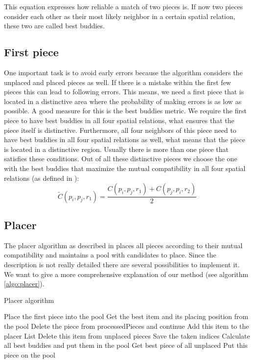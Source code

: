 \documentclass[11pt]{report}
\begin{document}
This equation expresses how reliable a match of two pieces is. If now two pieces consider each other as their most likely neighbor in a certain spatial relation, these two are called best buddies.

\subsection{First piece}
One important task is to avoid early errors because the algorithm considers the unplaced and placed pieces as well. If there is a mistake within the first few pieces this can lead to following errors.
This means, we need a first piece that is located in a distinctive area where the probability of making errors is as low as possible. A good measure for this is the best buddies metric. We require the first piece to have best buddies in all four spatial relations, what ensures that the piece itself is distinctive. Furthermore, all four neighbors of this piece need to have best buddies in all four spatial relations as well, what means that the piece is located in a distinctive region. 
Usually there is more than one piece that satisfies these conditions. Out of all these distinctive pieces we choose the one with the best buddies that maximize the mutual compatibility in all four spatial relations (as defined in \cite{Paikin2015}):
\begin{equation}\label{eq:mutualComp}
\widetilde{C}(p_i,p_j,r_1) = \frac{C(p_i,p_j,r_1)+C(p_j,p_i,r_2)}{2}
\end{equation}

\subsection{Placer}
The placer algorithm as described in \cite{Paikin2015} places all pieces according to their mutual compatibility and maintains a pool with candidates to place. Since the description is not really detailed there are several possibilities to implement it. We want to give a more comprehensive explanation of our method (see algorithm \ref{algo:placer}).

\begin{algorithm}
	\caption{Placer algorithm}
	\label{algo:placer}
	\begin{algorithmic}
		\State Place the first piece into the pool
				\State Get the best item and its placing position from the pool
					\State Delete the piece from processedPieces and continue \EndIf
				\State Add this item to the placer List
				\State Delete this item from unplaced pieces
				\State Save the taken indices
				\State Calculate all best buddies and put them in the pool
			\EndWhile
		\State Get best piece of all unplaced
			\State Put this piece on the pool
		\EndIf
		\EndWhile
	\end{algorithmic}
\end{algorithm}
\end{document}
